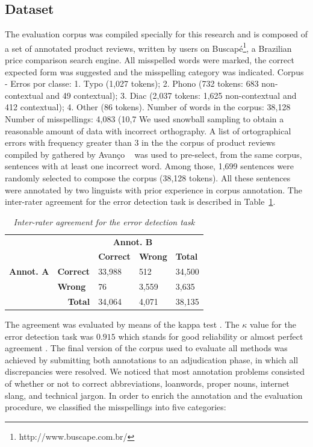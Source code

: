 \subsection{Dataset}\label{sec:dataset}

The evaluation corpus was compiled specially for this research and is composed of a set of  annotated product reviews, written by users on Buscap\'e\footnote{http://www.buscape.com.br/}, a Brazilian price comparison search engine. All misspelled words were marked, the correct expected form was suggested and the misspelling category was indicated.
Corpus - Erros por classe:
1. Typo (1,027 tokens);
 2. Phono (732 tokens: 683 non-contextual and 49 contextual);
 3. Diac (2,037 tokens: 1,625 non-contextual and 412 contextual);
 4. Other (86 tokens).
Number of words in the corpus: 38,128
Number of misspellings: 4,083  (10,7%
We used snowball sampling to obtain a reasonable amount of data with incorrect orthography. A  list of ortographical errors with frequency greater than 3 in the  the corpus of product reviews compiled by \cite{Hartmann2014}
gathered by Avan\c{c}o ~\cite{Avanco2014} 
was used to pre-select, from the same corpus, sentences with at least
one incorrect word. Among those, 1,699 sentences were randomly
selected to compose the corpus (38,128 tokens). All these sentences
were annotated by two linguists with prior experience in corpus annotation. The inter-rater agreement for the error detection task is described in Table~\ref{tab:kappa}.

\begin{table}[ht!]
\scriptsize
\centering
\caption{\it Inter-rater agreement for the error detection task}
\begin{tabular}{|lllll|}
\hline
 &  & \multicolumn{ 2}{c}{\textbf{Annot. B}} &  \\ \cline{3-4}
 &  & \textbf{Correct} & \textbf{Wrong} & \textbf{Total} \\ \hline
\textbf{Annot. A} & \textbf{Correct} & 33,988 & 512 & 34,500 \\
 & \textbf{Wrong} & 76 & 3,559 & 3,635 \\ \hline
\multicolumn{ 2}{|r}{\textbf{Total}}  & 34,064 & 4,071 & 38,135 \\ \hline
\end{tabular}
\label{tab:kappa}
\end{table}

The agreement was evaluated by means of the kappa test \cite{Carletta1996}. The $\kappa$
value for the error detection task was $0.915$ which stands for good reliability or almost perfect 
agreement \cite{Landis1977}. The final version of the corpus used 
to evaluate all methods was achieved by submitting both annotations to an adjudication
phase, in which all discrepancies were resolved. We noticed that most annotation 
problems consisted of whether or not to correct abbreviations, loanwords, proper nouns, internet slang, and technical jargon. In order to enrich the annotation and the evaluation procedure, we classified the misspellings into five categories:

